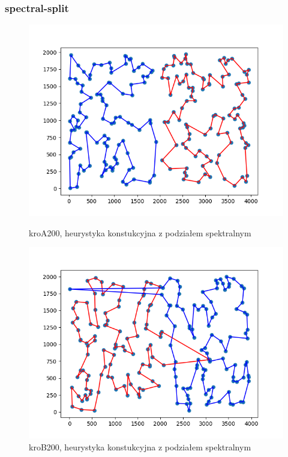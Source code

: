 \documentclass[11pt]{article}
\begin{document}
\subsubsection{spectral-split}
\begin{figure}[H]
    \begin{minipage}[t]{0.45\textwidth}
        \centering
        \includegraphics[width=\linewidth]{best_paths_constructions/kroA200/spectral_split_two_regret}
        \caption{kroA200, heurystyka konstukcyjna z podziałem spektralnym}
    \end{minipage}
    \hfill
    \begin{minipage}[t]{0.45\textwidth}
        \centering
        \includegraphics[width=\linewidth]{best_paths_constructions/kroB200/spectral_split_two_regret}
        \caption{kroB200, heurystyka konstukcyjna z podziałem spektralnym}
    \end{minipage}\label{fig:figure35}
\end{figure}
\end{document}
